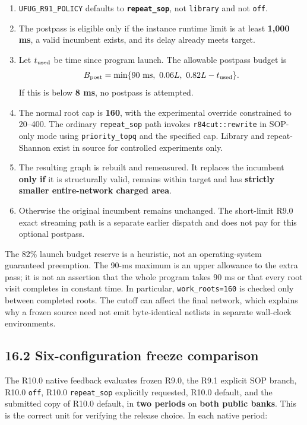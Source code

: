 \begin{enumerate}
\def\labelenumi{\arabic{enumi}.}
\tightlist
\item
  \texttt{UFUG\_R91\_POLICY} defaults to \textbf{\texttt{repeat\_sop}}, not \texttt{library} and not \texttt{off}.
\item
  The postpass is eligible only if the instance runtime limit is at least \textbf{1,000 ms}, a valid incumbent exists, and its delay already meets target.
\item
  Let \(t_{\rm used}\) be time since program launch. The allowable postpass budget is \[
  B_{\rm post}=\min\{90\text{ ms},\ 0.06L,\ 0.82L-t_{\rm used}\}.
  \] If this is below \textbf{8 ms}, no postpass is attempted.
\item
  The normal root cap is \textbf{160}, with the experimental override constrained to 20--400. The ordinary \texttt{repeat\_sop} path invokes \texttt{r84cut::rewrite} in SOP-only mode using \texttt{priority\_topq} and the specified cap. Library and repeat-Shannon exist in source for controlled experiments only.
\item
  The resulting graph is rebuilt and remeasured. It replaces the incumbent \textbf{only if} it is structurally valid, remains within target and has \textbf{strictly smaller entire-network charged area}.
\item
  Otherwise the original incumbent remains unchanged. The short-limit R9.0 exact streaming path is a separate earlier dispatch and does not pay for this optional postpass.
\end{enumerate}

The 82\% launch budget reserve is a heuristic, not an operating-system guaranteed preemption. The 90-ms maximum is an upper allowance to the extra pass; it is not an assertion that the whole program takes 90 ms or that every root visit completes in constant time. In particular, \texttt{work\_roots=160} is checked only between completed roots. The cutoff can affect the final network, which explains why a frozen source need not emit byte-identical netlists in separate wall-clock environments.

\subsection{16.2 Six-configuration freeze comparison}\label{six-configuration-freeze-comparison}

The R10.0 native feedback evaluates frozen R9.0, the R9.1 explicit SOP branch, R10.0 \texttt{off}, R10.0 \texttt{repeat\_sop} explicitly requested, R10.0 default, and the submitted copy of R10.0 default, in \textbf{two periods} on \textbf{both public banks}. This is the correct unit for verifying the release choice. In each native period:

